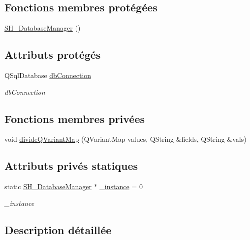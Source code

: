 \subsection*{Fonctions membres protégées}
\begin{DoxyCompactItemize}
\item 
\hyperlink{classSimpleHotel_1_1SH__DatabaseManager_ade00a085fdf7207d67476179e179d03d}{S\-H\-\_\-\-Database\-Manager} ()
\end{DoxyCompactItemize}
\subsection*{Attributs protégés}
\begin{DoxyCompactItemize}
\item 
Q\-Sql\-Database \hyperlink{classSimpleHotel_1_1SH__DatabaseManager_a01130ad218e0a00e80f53c4894996d19}{db\-Connection}
\begin{DoxyCompactList}\small\item\em db\-Connection \end{DoxyCompactList}\end{DoxyCompactItemize}
\subsection*{Fonctions membres privées}
\begin{DoxyCompactItemize}
\item 
void \hyperlink{classSimpleHotel_1_1SH__DatabaseManager_a35a879c68dc40e386ff536e97ae2733d}{divide\-Q\-Variant\-Map} (Q\-Variant\-Map values, Q\-String \&fields, Q\-String \&vals)
\end{DoxyCompactItemize}
\subsection*{Attributs privés statiques}
\begin{DoxyCompactItemize}
\item 
static \hyperlink{classSimpleHotel_1_1SH__DatabaseManager}{S\-H\-\_\-\-Database\-Manager} $\ast$ \hyperlink{classSimpleHotel_1_1SH__DatabaseManager_af0c50165131f4999f3b18f44bb143567}{\-\_\-instance} = 0
\begin{DoxyCompactList}\small\item\em \-\_\-instance \end{DoxyCompactList}\end{DoxyCompactItemize}


\subsection{Description détaillée}


